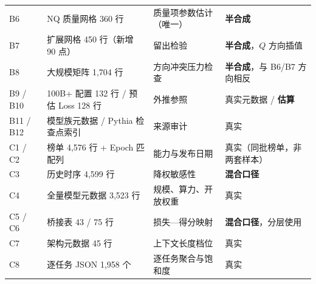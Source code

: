 \begin{table}[H]
\begin{tabularx}{\textwidth}{@{}p{1.25cm}X p{3.8cm}p{3.05cm}@{}}
B6 & NQ 质量网格 360 行 & 质量项参数估计（唯一） & \textbf{半合成} \\
B7 & 扩展网格 450 行（新增 90 点） & 留出检验 & \textbf{半合成}，$Q$ 方向插值 \\
B8 & 大规模矩阵 1,704 行 & 方向冲突压力检查 & \textbf{半合成}，与 B6/B7 方向相反 \\
B9 / B10 & 100B+ 配置 132 行 / 预估 Loss 128 行 & 外推参照 & 真实元数据 / \textbf{估算} \\
B11 / B12 & 模型族元数据 / Pythia 检查点索引 & 来源审计 & 真实 \\
C1 / C2 & 榜单 4,576 行 + Epoch 匹配列 & 能力与发布日期 & 真实（同批榜单，非两套样本） \\
C3 & 历史时序 4,599 行 & 降权敏感性 & \textbf{混合口径} \\
C4 & 全量模型元数据 3,523 行 & 规模、算力、开放权重 & 真实 \\
C5 / C6 & 桥接表 43 / 75 行 & 损失—得分映射 & \textbf{混合口径}，分层使用 \\
C7 & 架构元数据 45 行 & 上下文长度档位 & 真实 \\
C8 & 逐任务 JSON 1,958 个 & 逐任务聚合与饱和度 & 真实 \\
\bottomrule
\end{tabularx}
\end{table}
